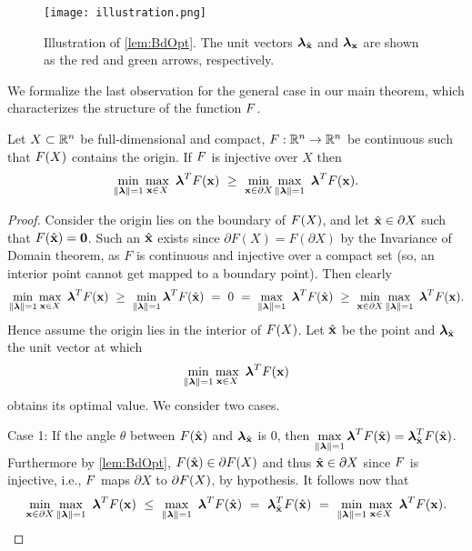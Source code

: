 \begin{figure}[htp!]
\begin{center}
  \texttt{[image: illustration.png]}
\end{center}
\caption{\label{fig:illustration}
  Illustration of \cref{lem:BdOpt}.
  The unit vectors $\boldsymbol{\lambda}_{\hat{\mathbf{x}}}$ and $\boldsymbol{\lambda}_{\mathbf{x}}$ are shown as the red and green arrows, respectively.
}
\end{figure}

We formalize the last observation for the general case in our main theorem, which characterizes the structure of the function $F$.

\begin{thm} 
  \label{thm:MainIneq}
  Let $X\subset\mathbb{R}^n$ be full-dimensional and compact, $F:\mathbb{R}^n\rightarrow\mathbb{R}^n$ be continuous such that $F(X)$ contains the origin. 
  If $F$ is injective over $X$ then
  \[
  \min\limits_{\lVert\boldsymbol{\lambda}\rVert=1}\max\limits_{\mathbf{x}\in X}\ \boldsymbol{\lambda}^TF(\mathbf{x}) ~\geq~ \min\limits_{\mathbf{x}\in \partial X} \max\limits_{\lVert\boldsymbol{\lambda}\rVert=1}\ \boldsymbol{\lambda}^TF(\mathbf{x}).
  \]
  \begin{proof}
    Consider the origin lies on the boundary of $F(X)$, and let $\hat{\mathbf{x}} \in \partial X$ such that $F(\hat{\mathbf{x}})=\mathbf{0}$. 
    Such an $\hat{\mathbf{x}}$ exists since $\partial F(X) = F(\partial X)$ by the Invariance of Domain theorem, as $F$ is continuous and injective over a compact set (so, an interior point cannot get mapped to a boundary point). 
    Then  clearly
    \[
       \min\limits_{\norm{\vlambda}=1}\max\limits_{\vx\in X}\ \vlambda^T\vF(\vx) ~\geq~
       \min\limits_{\norm{\vlambda}=1}\vlambda^T\vF(\hat{\vx}) ~=~ 0 ~=~
       \max\limits_{\norm{\vlambda}=1}\ \vlambda^T\vF(\hat{\vx}) ~\geq~
       \min\limits_{\vx\in \partial X}\max\limits_{\norm{\vlambda}=1}\ \vlambda^T\vF(\vx).
    \]
    Hence assume the origin lies in the interior of $F(X)$.
    Let $\hat{\mathbf{x}}$ be the point and $\boldsymbol{\lambda}_{\hat{\mathbf{x}}}$ the unit vector at which
    \[
    \min\limits_{\lVert\boldsymbol{\lambda}\rVert=1}\max\limits_{\mathbf{x}\in X}\ \boldsymbol{\lambda}^TF(\mathbf{x})
    \]
    obtains its optimal value.
    We consider two cases.

    Case 1: If the angle $\theta$ between $F(\hat{\mathbf{x}})$ and $\boldsymbol{\lambda}_{\hat{\mathbf{x}}}$ is $0$, then $\displaystyle \max\limits_{\lVert\boldsymbol{\lambda}\rVert=1}\boldsymbol{\lambda}^TF(\hat{\mathbf{x}}) = \boldsymbol{\lambda}_{\hat{\mathbf{x}}}^TF(\hat{\mathbf{x}})$. 
    Furthermore by \cref{lem:BdOpt}, $F(\hat{\mathbf{x}}) \in \partial F(X)$ and thus $\hat{\mathbf{x}}\in \partial X$ since $F$ is injective, i.e., $F$ maps $\partial X$ to $\partial F(X)$, by hypothesis. 
    It follows now that
    \[
      \min\limits_{\vx\in \partial X}\max\limits_{\norm{\vlambda}=1}\ \vlambda^T\vF(\vx) ~\leq~
      \max\limits_{\norm{\vlambda}=1}\ \vlambda^T\vF(\hat{\vx}) ~=~
      \vlambda_{\hat{\vx}}^T\vF(\hat{\vx}) ~=~
      \min\limits_{\norm{\vlambda}=1}\max\limits_{\vx\in X}\ \vlambda^T\vF(\vx).
    \]


\end{proof}
\end{thm}
